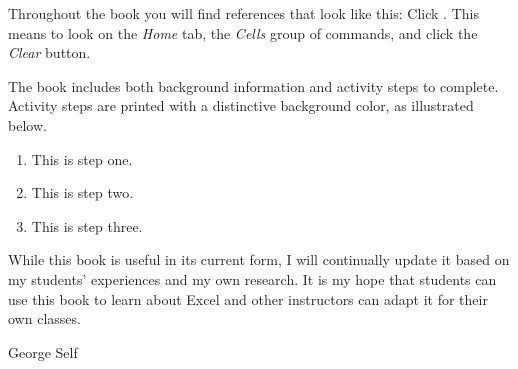 Throughout the book you will find references that look like this: Click . This means to look on the \textit{Home} tab, the \textit{Cells} group of commands, and click the \textit{Clear} button.

The book includes both background information and activity steps to complete. Activity steps are printed with a distinctive background color, as illustrated below.

\begin{enumbox}
	\begin{enumerate}
	\item This is step one.
	\item This is step two.
	\item This is step three.
	\end{enumerate}
\end{enumbox}

While this book is useful in its current form, I will continually update it based on my students' experiences and my own research. It is my hope that students can use this book to learn about Excel and other instructors can adapt it for their own classes.

\bigskip
\begin{flushright}
  \textemdash \; George Self
\end{flushright}


